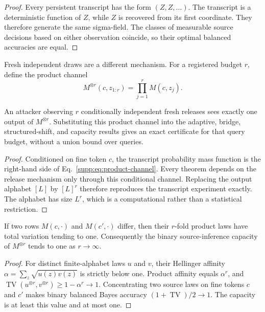 \begin{proof}
Every persistent transcript has the form $(Z,Z,\ldots)$. The transcript is a
deterministic function of $Z$, while $Z$ is recovered from its first
coordinate. They therefore generate the same sigma-field. The classes of
measurable source decisions based on either observation coincide, so their
optimal balanced accuracies are equal.
\end{proof}

Fresh independent draws are a different mechanism. For a registered budget
$r$, define the product channel
\begin{equation}
 M^{\otimes r}(c,z_{1:r})=\prod_{j=1}^{r}M(c,z_j).
 \label{supp:eq:product-channel}
\end{equation}

\begin{proposition}
An attacker observing $r$ conditionally independent fresh releases sees
exactly one output of $M^{\otimes r}$. Substituting this product channel into
the adaptive, bridge, structured-shift, and capacity results gives an exact
certificate for that query budget, without a union bound over queries.
\end{proposition}

\begin{proof}
Conditioned on fine token $c$, the transcript probability mass function is the
right-hand side of Eq.~\eqref{supp:eq:product-channel}. Every theorem depends
on the release mechanism only through this conditional channel. Replacing the
output alphabet $[L]$ by $[L]^r$ therefore reproduces the transcript experiment
exactly. The alphabet has size $L^r$, which is a computational rather than a
statistical restriction.
\end{proof}

\begin{proposition}
If two rows $M(c,\cdot)$ and $M(c',\cdot)$ differ, then their $r$-fold product
laws have total variation tending to one. Consequently the binary
source-inference capacity of $M^{\otimes r}$ tends to one as $r\to\infty$.
\end{proposition}

\begin{proof}
For distinct finite-alphabet laws $u$ and $v$, their Hellinger affinity
$\alpha=\sum_z\sqrt{u(z)v(z)}$ is strictly below one. Product affinity equals
$\alpha^r$, and
$\operatorname{TV}(u^{\otimes r},v^{\otimes r})\geq1-\alpha^r\to1$.
Concentrating two source laws on fine tokens $c$ and $c'$ makes binary balanced
Bayes accuracy
$(1+\operatorname{TV})/2\to1$. The capacity is at least this value and at most
one.
\end{proof}


